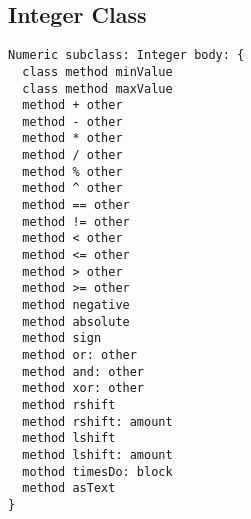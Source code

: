 \subsection{Integer Class}

\begin{lstlisting}
Numeric subclass: Integer body: {
  class method minValue
  class method maxValue
  method + other
  method - other
  method * other
  method / other
  method % other
  method ^ other
  method == other
  method != other
  method < other
  method <= other
  method > other
  method >= other
  method negative
  method absolute
  method sign
  method or: other
  method and: other
  method xor: other
  method rshift
  method rshift: amount
  method lshift
  method lshift: amount
  mothod timesDo: block
  method asText
}
\end{lstlisting}
